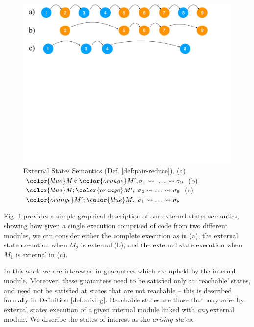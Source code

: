 \begin{figure}[htb]
  \vspace*{-2.5mm}
  \begin{center}
   \begin{minipage}{0.80\textwidth}
     \begin{center}
       \includegraphics[width=\linewidth]{diagrams/VisibleStates.pdf}
     \end{center}
   \end{minipage}
   \end{center}
   \vspace*{-2.5mm}
   \caption{External States Semantics
     (Def. \ref{def:pair-reduce}). %
     (a) $\exec{{\color{blue}M} \circ {\color{orange}M'}}{\sigma_1}{\ldots}\leadsto \sigma_9$
     (b) $\reduction{{\color{blue}M}}{{\color{orange}M'}}{\sigma_2}{\ldots}\leadsto \sigma_9$
     (c) $\reduction{{\color{orange}M'}}{{\color{blue}M}}{\sigma_1}{\ldots}\leadsto \sigma_8$
    }
   \label{fig:VisibleStates}
 \end{figure}
 
Fig. \ref{fig:VisibleStates} provides a simple graphical description of 
our external states semantics, showing how given a single execution 
comprised of code from two different modules, we can consider either
the complete execution as in (a), the external state execution when $M_2$ is external (b), and the external state execution when $M_1$ is external  in (c).
 





In this work we are interested in guarantees which are upheld by the internal 
module. Moreover,    these guarantees  need to be satisfied only at `reachable' states,
and need not be satisfied at states that are
not reachable -- this is described formally in Definition \ref{def:arising}. 
Reachable states are those that  may arise by external states execution
of  a given internal module linked with \emph{any} external module.
We describe the states of interest as the \emph{arising states}. 



